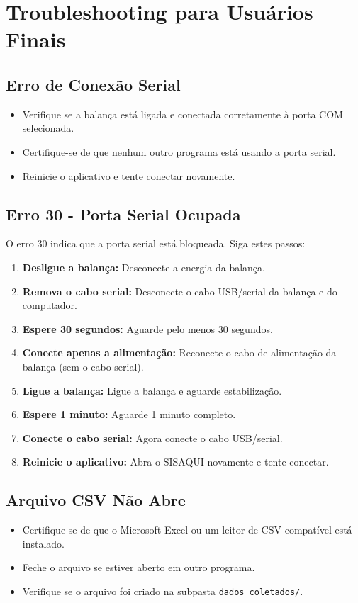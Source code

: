 \documentclass[12pt,a4paper]{article}
\begin{document}
\section{Troubleshooting para Usuários Finais}

\subsection{Erro de Conexão Serial}
\begin{itemize}
\item Verifique se a balança está ligada e conectada corretamente à porta COM selecionada.
\item Certifique-se de que nenhum outro programa está usando a porta serial.
\item Reinicie o aplicativo e tente conectar novamente.
\end{itemize}

\subsection{Erro 30 - Porta Serial Ocupada}
O erro 30 indica que a porta serial está bloqueada. Siga estes passos:

\begin{enumerate}
    \item \textbf{Desligue a balança:} Desconecte a energia da balança.
    \item \textbf{Remova o cabo serial:} Desconecte o cabo USB/serial da balança e do computador.
    \item \textbf{Espere 30 segundos:} Aguarde pelo menos 30 segundos.
    \item \textbf{Conecte apenas a alimentação:} Reconecte o cabo de alimentação da balança (sem o cabo serial).
    \item \textbf{Ligue a balança:} Ligue a balança e aguarde estabilização.
    \item \textbf{Espere 1 minuto:} Aguarde 1 minuto completo.
    \item \textbf{Conecte o cabo serial:} Agora conecte o cabo USB/serial.
    \item \textbf{Reinicie o aplicativo:} Abra o SISAQUI novamente e tente conectar.
\end{enumerate}

\subsection{Arquivo CSV Não Abre}
\begin{itemize}
\item Certifique-se de que o Microsoft Excel ou um leitor de CSV compatível está instalado.
\item Feche o arquivo se estiver aberto em outro programa.
\item Verifique se o arquivo foi criado na subpasta \texttt{dados coletados/}.
\end{itemize}
\end{document}
